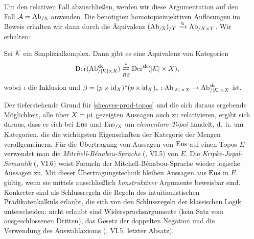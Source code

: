 Um den relativen Fall abzuschließen, werden wir diese Argumentation
auf den Fall $\mathcal{A} = \operatorname{Ab_{/X}}$ anwenden. Die benötigten
homotopieinjektiven Auflösungen im Beweis erhalten wir dann durch die
Äquivalenz $(\operatorname{Ab_{/X}})_{/Y} \xrightarrow{\approx} \operatorname{Ab}_{/X \times Y}$. Wir erhalten:
\begin{theorem} \label{dersk-eq-rel}
  Sei $\mathcal{K}$ ein Simplizialkomplex. Dann gibt es eine Äquivalenz von
  Kategorien
  \[ \operatorname{Der}(\operatorname{Ab}^{\operatorname{sk}}_{/|\mathcal{K}| \times X})
     \mathrel{\mathop{\rightleftarrows}^{\iota}_{R \beta}}
     \operatorname{Der}^{\operatorname{sk}}(|\mathcal{K}| \times X),
  \]
  wobei $\iota$ die Inklusion und $\beta = (p \times \operatorname{id}_X)^* (p
  \times \operatorname{id}_X)_*: \operatorname{Ab}_{|\mathcal{K}| \times X} \to \operatorname{Ab}^{\operatorname{sk}}_{/|\mathcal{K}| \times X}$
  ist.
\end{theorem}
\begin{bem}
  Der tieferstehende Grund für \ref{sheaves-prod-topos} und die sich
  daraus ergebende Möglichkeit, alle über $X = \operatorname{pt}$ gezeigten
  Aussagen auch zu relativieren, ergibt sich daraus, dass es sich bei
  $\operatorname{Ens}$ und $\operatorname{Ens_{/X}}$ um \emph{elementare Topoi} handelt, d.~h. um
  Kategorien, die die wichtigsten Eigenschaften der Kategorie der
  Mengen verallgemeinern. Für die Übertragung von Aussagen von $\operatorname{Ens}$
  auf einen Topos $E$ verwendet man die
  \emph{Mitchell-Bénabou-Sprache} (\cite{MoerTopoi}, VI.5) von
  $E$. Die \emph{Kripke-Joyal-Semantik} (\cite{MoerTopoi}, VI.6) weist
  Formeln der Mitchell-Bénabou-Sprache wieder logische Aussagen
  zu. Mit dieser Übertragungstechnik bleiben Aussagen aus $\operatorname{Ens}$ in
  $E$ gültig, wenn sie mittels ausschließlich \emph{konstruktiver}
  Argumente beweisbar sind. Konkreter sind als Schlussregeln die
  Regeln des intuitionistischen Prädikatenkalküls erlaubt, die sich
  von den Schlussregeln der klassischen Logik unterscheiden: nicht
  erlaubt sind Widerspruchsargumente (kein Satz vom ausgeschlossenen
  Dritten), das Gesetz der doppelten Negation und die Verwendung des
  Auswahlaxioms (\cite{MoerTopoi}, VI.5, letzter Absatz).
\end{bem}

